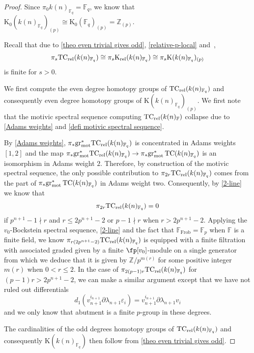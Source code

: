 \documentclass[english,10pt]{amsart}
\newcommand{\rel}{\textup{rel}}
\newcommand{\field}{\mathbb{F}}
\theoremstyle{definition}
\numberwithin{equation}{section}
\DeclareMathOperator{\tc}{\ensuremath{\textup{TC}}}
\newcommand{\rtc}{\mathrm{TC}_{\rel}}
\newcommand{\grmot}{\mathrm{gr}_{\textup{mot}}^*}
\newcommand{\z}{\mathbb{Z}}
\newcommand{\pis}{\pi_*}
\begin{document}
\begin{proof}
 Since $\pi_0k(n)_{\field_q}=\field_q$, we know that $\mathrm{K}_0(k(n)_{\field_q})_{(p)}\cong \mathrm{K}_0(\field_q)_{(p)}=\mathbb{Z}_{(p)}$.
 
Recall that due to \autoref{theo even trivial gives odd}, \autoref{relative-p-local} and~\cite[Theorem~7.0.0.2]{DGM13}, 
\[\pi_s\rtc(k(n)_{\field_q})\cong \pi_s\mathrm{K}_{\rel}(k(n)_{\field_q})\cong  \pi_s\mathrm{K}(k(n)_{\field_q})_{(p)}\] 
is finite for $s>0$.

We first compute the even degree homotopy groups of $\rtc(k(n)_{\field_q})$ and consequently even degree homotopy groups of $\mathrm{K}(k(n)_{\field_q})_{(p)}$. We first note that the motivic spectral sequence computing $\rtc(k(n)_\field)$ collapse due to \autoref{Adams weights} and  \autoref{defi motivic spectral sequence}.

By \autoref{Adams weights}, $\pi_*\grmot \rtc(k(n)_{\field_q})$ is concentrated in Adams weights $[1,2]$ and the map $\pis\grmot \rtc(k(n)_{\field_q})\to \pis\grmot \tc(k(n)_{\field_q})$ is an isomorphism in Adams weight $2$. Therefore, by construction of the motivic spectral sequence, the only possible contribution to $\pi_{2r}\rtc(k(n)_{\field_q})$ comes from the part of $\pi_{*}\grmot\tc(k(n)_{\field_q})$ in Adams weight two.  Consequently, by \autoref{2-line} we know that 
\[\pi_{2r}\rtc(k(n)_{\field_q})=0\]
if $p^{n+1}-1\nmid r$ and $r\leq 2p^{n+1}-2$ or $p-1\nmid r$ when $r> 2p^{n+1}-2$. 
Applying the $v_0$-Bockstein spectral sequence, \autoref{2-line} and the fact that $\field_{\mathrm{Frob}}=\mathbb{F}_p$ when $\field$ is a finite field, we know 
$\pi_{r(2p^{n+1}-2)}\rtc(k(n)_{\field_q})$ is equipped with a finite filtration with associated graded given by a finite $\fp[v_{0}]$-module on a single generator from which we deduce that it is given by $\z/p^{m(r)}$ for some positive integer $m(r)$ when $0<r\le 2$. In the case of $\pi_{2(p-1)r}\rtc(k(n)_{\field_q})$ for $(p-1)r> 2p^{n+1}-2$, we can make a similar argument except that we have not ruled out differentials
\[ d_{1}(v_{n+1}^{i_{n+1}}\partial \lambda_{n+1}\varepsilon_i)=v_{n+1}^{i_{n+1}}\partial \lambda_{n+1}v_i
\]
and we only know that abutment is a finite $p$-group in these degrees.

The cardinalities of the odd degrees homotopy groups of $\rtc(k(n)_{\field_q})$ and consequently $\mathrm{K}(k(n)_{\field_q})$ then follow from \autoref{theo even trivial gives odd}.
\end{proof}
\end{document}
